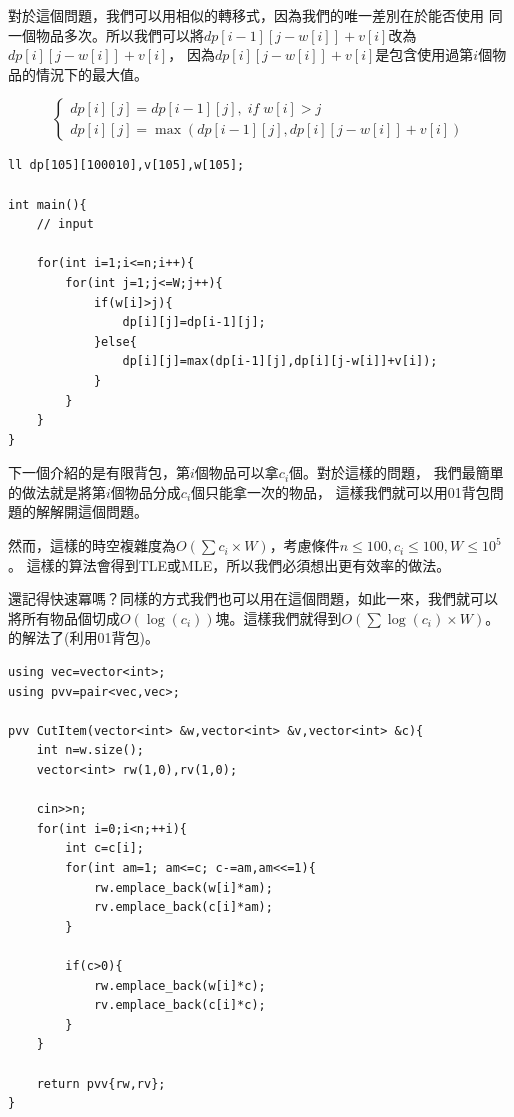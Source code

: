     對於這個問題，我們可以用相似的轉移式，因為我們的唯一差別在於能否使用
    同一個物品多次。所以我們可以將$dp[i-1][j-w[i]]+v[i]$改為$dp[i][j-w[i]]+v[i]$，
    因為$dp[i][j-w[i]]+v[i]$是包含使用過第$i$個物品的情況下的最大值。

    $$
    \begin{cases}
        dp[i][j]=dp[i-1][j], \; if \; w[i]>j \\
        dp[i][j]=\max(dp[i-1][j],dp[i][j-w[i]]+v[i])
    \end{cases}
    $$

\begin{lstlisting}[caption=無限背包]
ll dp[105][100010],v[105],w[105];

int main(){
    // input
    
    for(int i=1;i<=n;i++){
        for(int j=1;j<=W;j++){
            if(w[i]>j){
                dp[i][j]=dp[i-1][j];
            }else{
                dp[i][j]=max(dp[i-1][j],dp[i][j-w[i]]+v[i]);
            }
        }
    }
}
\end{lstlisting}

    下一個介紹的是有限背包，第$i$個物品可以拿$c_i$個。對於這樣的問題，
    我們最簡單的做法就是將第$i$個物品分成$c_i$個只能拿一次的物品，
    這樣我們就可以用01背包問題的解解開這個問題。

    然而，這樣的時空複雜度為$O(\sum{c_i} \times W)$，考慮條件$n \le 100, c_i \le 100, W \le 10^5$。
    這樣的算法會得到TLE或MLE，所以我們必須想出更有效率的做法。

    還記得快速冪嗎？同樣的方式我們也可以用在這個問題，如此一來，我們就可以
    將所有物品個切成$O(\log(c_i))$塊。這樣我們就得到$O(\sum{\log(c_i)} \times W)$。
    的解法了(利用01背包)。

\begin{lstlisting}[caption=物品切割]
using vec=vector<int>;
using pvv=pair<vec,vec>;

pvv CutItem(vector<int> &w,vector<int> &v,vector<int> &c){
    int n=w.size();
    vector<int> rw(1,0),rv(1,0);

    cin>>n;
    for(int i=0;i<n;++i){
        int c=c[i];
        for(int am=1; am<=c; c-=am,am<<=1){
            rw.emplace_back(w[i]*am);
            rv.emplace_back(c[i]*am);
        }
        
        if(c>0){
            rw.emplace_back(w[i]*c);
            rv.emplace_back(c[i]*c);
        }
    }

    return pvv{rw,rv};
}
\end{lstlisting}

